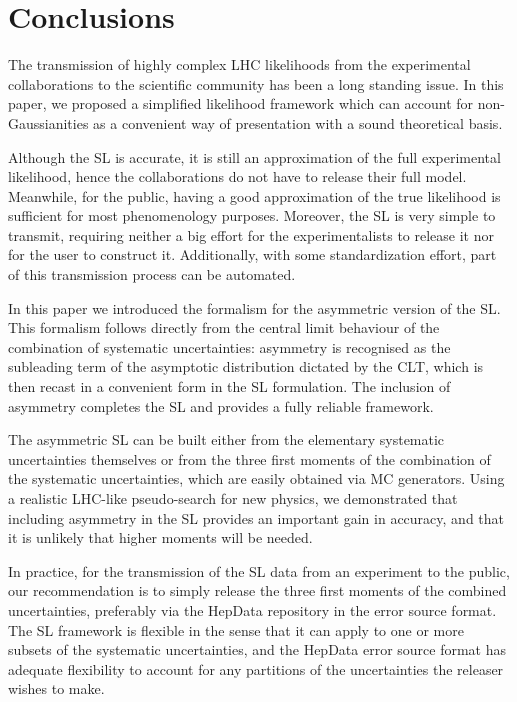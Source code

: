 \documentclass[11pt]{article}
\begin{document}
\section{Conclusions}
\label{se:conclusions}


The transmission of highly complex LHC likelihoods from the experimental collaborations to the scientific community
has been a long standing issue. %
In this paper, we proposed a simplified likelihood framework which can account for non-Gaussianities as a convenient way of presentation 
with a sound theoretical basis. %

Although the SL is  accurate, it is still an approximation of the full experimental likelihood, hence the collaborations 
do not have to release their full %
model.
Meanwhile, for the public, having a good approximation of the true likelihood is sufficient for most phenomenology purposes. 
Moreover, the SL is very simple to transmit, requiring neither a big effort for the experimentalists to release it nor for the user to construct it. Additionally, with some standardization effort, part of this transmission process can be automated. 

In this paper we introduced the formalism for the asymmetric version of the SL. 
This formalism follows directly from the central limit behaviour of the combination of systematic uncertainties: asymmetry is recognised as the subleading term of the asymptotic distribution dictated by the CLT, which is then recast in a convenient form in the SL formulation. 
The inclusion of asymmetry completes the SL and provides a fully reliable framework.

The asymmetric SL can be built either from the elementary systematic uncertainties themselves or from the three first moments  of the combination of the systematic uncertainties, which are easily obtained via MC generators. 
Using a realistic LHC-like pseudo-search for new physics, we demonstrated that including asymmetry in the SL provides  
an important gain in accuracy, and  that it is unlikely that higher moments will be needed.

In practice, for the transmission of the SL data from an experiment to the public, our recommendation is to simply release the three first moments of the combined uncertainties, preferably via the HepData repository in the error source format.  The SL framework is flexible in the sense that it can apply to one or more subsets of the systematic uncertainties,  and the HepData error source format  has adequate flexibility to account for any partitions of the uncertainties the releaser wishes to make.
\end{document}
